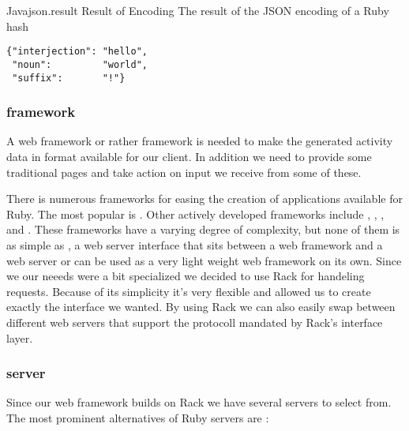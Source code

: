 \begin{scode}{Java}{json.result}{%
  Result of  Encoding}{%
  The result of the JSON encoding of a Ruby hash}
\begin{lstlisting}
{"interjection": "hello",
 "noun":         "world",
 "suffix":       "!"}
\end{lstlisting}
\end{scode}

\subsubsection{ framework}

A web framework or rather  framework is needed to make the
generated activity data in  format available for our client.
In addition we need to provide some traditional  pages and
take action on input we receive from some of these.

There is numerous frameworks for easing the creation of 
applications available for Ruby. The most popular%
is %
.
Other actively developed frameworks include
,
,
, and
.%
These frameworks have a varying degree of complexity, but none of them
is as simple as %
,
a web server interface that sits between a web framework and a web
server or can be used as a very light weight web framework on its own.
Since we our neeeds were a bit specialized we decided to use Rack for
handeling  requests. Because of its simplicity it's very
flexible and allowed us to create exactly the  interface
we wanted. By using Rack we can also easily swap between different
web servers that support the protocoll mandated by Rack's interface layer.

\subsubsection{ server}

Since our web framework builds on Rack we have several
 servers to select from. The most prominent alternatives
of Ruby servers are%
:

